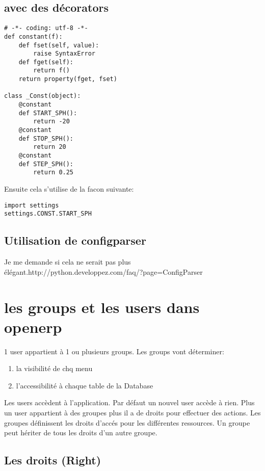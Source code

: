 \documentclass[12pt,a4paper]{article}
\begin{document}
\subsection{avec des décorators}
\label{sec:decorator}
\begin{verbatim}
# -*- coding: utf-8 -*-
def constant(f):
    def fset(self, value):
        raise SyntaxError
    def fget(self):
        return f()
    return property(fget, fset)

class _Const(object):
    @constant
    def START_SPH():
        return -20
    @constant
    def STOP_SPH():
        return 20
    @constant
    def STEP_SPH():
        return 0.25
\end{verbatim}
Ensuite cela s'utilise de la facon suivante:
\begin{verbatim}
import settings
settings.CONST.START_SPH
\end{verbatim}

\subsection{Utilisation de configparser}
\label{sec:configparser}

Je me demande si cela ne serait pas plus élégant.http://python.developpez.com/faq/?page=ConfigParser


\section{les groups et les users dans openerp}
\label{sec:group}

1 user appartient à 1 ou plusieurs groups. 
Les groups vont déterminer:
\begin{enumerate}
\item la visibilité de chq menu
\item l'accessibilité à chaque table de la Database
\end{enumerate}

Les users accèdent à l'application. Par défaut un nouvel user accède à rien. Plus un user appartient à des groupes plus il a de droits pour effectuer des actions. Les groupes définissent les droits d'accés pour les différentes ressources. Un groupe peut hériter de tous les droits d'un autre groupe.

\subsection{Les droits (Right)}
\label{sec:right}
\end{document}
